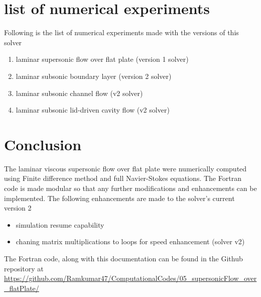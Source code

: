 \documentclass[conf]{new-aiaa}
\begin{document}
\section{list of numerical experiments}
Following is the list of numerical experiments made with the versions of this
solver

\begin{enumerate}
    \item laminar supersonic flow over flat plate (version 1 solver)
    \item laminar subsonic boundary layer (version 2 solver)
    \item laminar subsonic channel flow (v2 solver)
    \item laminar subsonic lid-driven cavity flow (v2 solver)
\end{enumerate}

\section{Conclusion}
The laminar viscous supersonic flow over flat plate were numerically computed
using Finite difference method and full Navier-Stokes equations. The Fortran
code is made modular so that any further modifications and enhancements can be
implemented. The following enhancements are made to the solver's current
version 2
\begin{itemize}
    \item simulation resume capability
    \item chaning matrix multiplications to loops for speed enhancement (solver v2)
\end{itemize}

\par The Fortran code, along with this documentation can be found in the
Github repository at \url{https://github.com/Ramkumar47/ComputationalCodes/05_supersonicFlow_over_flatPlate/}

% 

%


%
%     
%

\par
\center{**********}
\end{document}
